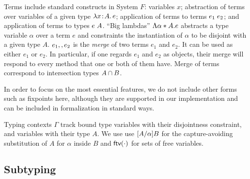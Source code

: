 Terms include standard constructs in System $F$: variables $x$; abstraction of
terms over variables of a given type $\lambda x \!:\! A.\, e$; application of terms to
terms $e_1 \; e_2$; and application of terms to types $e \; A$.
``Big lambdas'' $\Lambda \alpha * A. e$ abstracts a type variable
$\alpha$ over a term $e$ and constraints the instantiation of $\alpha$ to be
disjoint with a given type $A$. $e_1 ,, e_2$ is the \emph{merge} of two
terms $e_1$ and $e_2$. It can be used as either $ e_1 $ or $ e_2 $. In
particular, if one regards $e_1$ and $e_2$ as objects, their merge will respond
to every method that one or both of them have. Merge of terms correspond to
intersection types $A \cap B$.


In order to focus on the most essential features, we do not include other forms
such as fixpoints here, although they are supported in our implementation and
can be included in formalization in standard ways.

Typing contexts $ \Gamma $ track bound type variables with their disjointness
constraint, and variables with their type $A$. We use use $\lbrack A / \alpha \rbrack
{B}$ for the capture-avoiding substitution of $A$ for $\alpha$ inside $B$ and
$\textsf{ftv}(\cdot)$ for sets of free variables.


\subsection{Subtyping}


